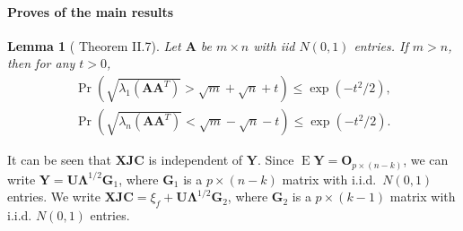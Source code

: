 \documentclass[12pt]{article} %
\DeclareMathOperator{\myE}{E}
\newcommand{\bA}{\mathbf{A}}
\newcommand{\bX}{\mathbf{X}}
\newcommand{\bY}{\mathbf{Y}}
\newcommand{\bG}{\mathbf{G}}
\newcommand{\bJ}{\mathbf{J}}
\newcommand{\bC}{\mathbf{C}}
\newcommand{\bO}{\mathbf{O}}
\newcommand{\bU}{\mathbf{U}}
\newcommand{\bfsym}[1]{\ensuremath{\boldsymbol{#1}}}
\def\bLambda {\bfsym {\Lambda}}
\newtheorem{lemma}{Lemma}
\theoremstyle{definition}
\begin{document}
\paragraph{Proves of the main results}
\begin{lemma}[\citet{DAVIDSON2001317} Theorem II.7]\label{DSbound}
    Let $\bA$ be $m\times n$ with iid $N(0,1)$ entries.
    If $m>n$, then for any $t>0$,
    \begin{align*}
        \Pr(\sqrt{\lambda_1(\bA \bA^T)}>\sqrt{m}+\sqrt{n}+t)\leq \exp(-t^2/2),\\
        \Pr(\sqrt{\lambda_n(\bA \bA^T)}<\sqrt{m}-\sqrt{n}-t)\leq \exp(-t^2/2).
    \end{align*}
\end{lemma}

It can be seen that $\bX\bJ\bC$ is independent of $\bY$.
Since
$
\myE \bY = \bO_{p\times (n-k)}
$,
we can write
$
\bY = \bU\bLambda^{1/2} \bG_1
$,
where $\bG_1$ is a $p\times (n-k)$ matrix with i.i.d.\ $N(0,1)$ entries.
We write
$
\bX\bJ\bC = \xi_f + \bU\bLambda^{1/2} \bG_2
$, 
where $\bG_2$ is a $p\times (k-1)$ matrix with i.i.d. $N(0,1)$ entries.
\end{document}
